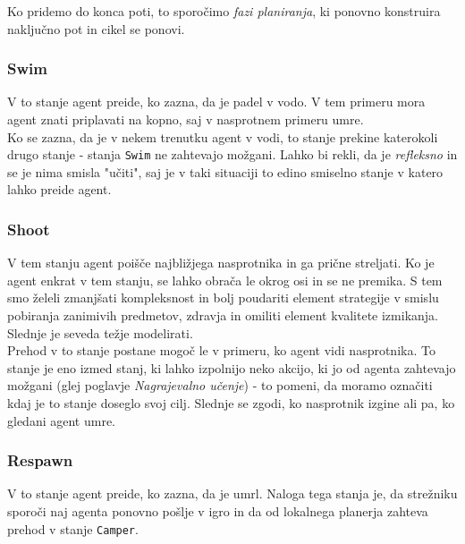 \documentclass[a4paper,10pt]{article}
\begin{document}
Ko pridemo do konca poti, to sporočimo \textit{fazi planiranja}, ki ponovno konstruira naključno pot in cikel se ponovi. 
  
\subsubsection{Swim}
V to stanje agent preide, ko zazna, da je padel v vodo. V tem primeru mora agent znati priplavati na kopno, saj v nasprotnem primeru umre.\\ 
Ko se zazna, da je v nekem trenutku agent v vodi, to stanje prekine katerokoli drugo stanje - stanja \verb+Swim+ ne zahtevajo možgani. Lahko bi rekli, da je 
\textit{refleksno} in se je nima smisla "učiti", saj je v taki situaciji to edino smiselno stanje v katero lahko preide agent.
\subsubsection{Shoot}
V tem stanju agent poišče najbližjega nasprotnika in ga prične streljati. Ko je agent enkrat v tem stanju, se lahko obrača le okrog osi in se ne premika. 
S tem smo želeli zmanjšati kompleksnost in bolj poudariti element strategije v smislu pobiranja zanimivih predmetov, zdravja in omiliti element kvalitete 
izmikanja. Slednje je seveda težje modelirati.\\
Prehod v to stanje postane mogoč le v primeru, ko agent vidi nasprotnika. To stanje je eno izmed stanj, ki lahko izpolnijo neko akcijo, ki jo od 
agenta zahtevajo možgani (glej poglavje \textit{Nagrajevalno učenje}) - to pomeni, da moramo označiti kdaj je to stanje doseglo svoj cilj.
Slednje se zgodi, ko nasprotnik izgine ali pa, ko gledani agent umre.
\subsubsection{Respawn}
V to stanje agent preide, ko zazna, da je umrl. Naloga tega stanja je, da strežniku sporoči naj agenta ponovno pošlje v igro in da od lokalnega
planerja zahteva prehod v stanje \verb+Camper+.
\end{document}
